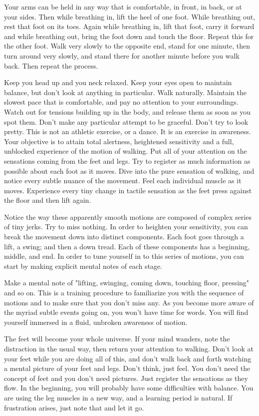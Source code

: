Your arms can be held in any way that is comfortable, in front, in back, or at
your sides. Then while breathing in, lift the heel of one foot. While breathing
out, rest that foot on its toes. Again while breathing in, lift that foot, carry
it forward and while breathing out, bring the foot down and touch the floor.
Repeat this for the other foot. Walk very slowly to the opposite end, stand for
one minute, then turn around very slowly, and stand there for another minute
before you walk back. Then repeat the process.

Keep you head up and you neck relaxed. Keep your eyes open to maintain balance,
but don't look at anything in particular. Walk naturally. Maintain the slowest
pace that is comfortable, and pay no attention to your surroundings. Watch out
for tensions building up in the body, and release them as soon as you spot them.
Don't make any particular attempt to be graceful. Don't try to look pretty. This
is not an athletic exercise, or a dance. It is an exercise in awareness. Your
objective is to attain total alertness, heightened sensitivity and a full,
unblocked experience of the motion of walking. Put all of your attention on the
sensations coming from the feet and legs. Try to register as much information as
possible about each foot as it moves. Dive into the pure sensation of walking,
and notice every subtle nuance of the movement. Feel each individual muscle as
it moves. Experience every tiny change in tactile sensation as the feet press
against the floor and then lift again.

Notice the way these apparently smooth motions are composed of complex series of
tiny jerks. Try to miss nothing. In order to heighten your sensitivity, you can
break the movement down into distinct components. Each foot goes through a lift,
a swing; and then a down tread. Each of these components has a beginning,
middle, and end. In order to tune yourself in to this series of motions, you can
start by making explicit mental notes of each stage.

Make a mental note of "lifting, swinging, coming down, touching floor, pressing"
and so on. This is a training procedure to familiarize you with the sequence of
motions and to make sure that you don't miss any. As you become more aware of
the myriad subtle events going on, you won't have time for words. You will find
yourself immersed in a fluid, unbroken awareness of motion.

The feet will become your whole universe. If your mind wanders, note the
distraction in the usual way, then return your attention to walking. Don't look
at your feet while you are doing all of this, and don't walk back and forth
watching a mental picture of your feet and legs. Don't think, just feel. You
don't need the concept of feet and you don't need pictures. Just register the
sensations as they flow. In the beginning, you will probably have some difficulties with
balance. You are using the leg muscles in a new way, and a learning period is
natural. If frustration arises, just note that and let it go.

